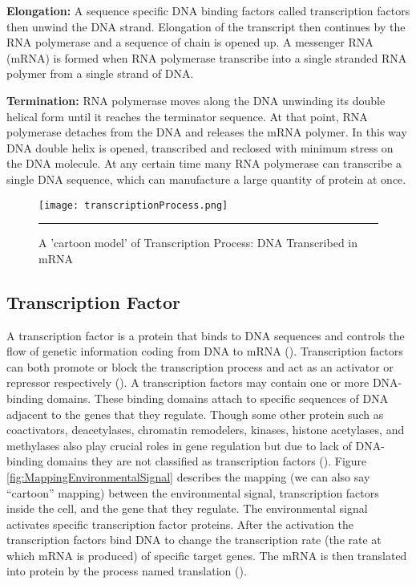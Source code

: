 \textbf{Elongation:} A sequence specific DNA binding factors called transcription factors then unwind 
the DNA strand. Elongation of the transcript then continues by the RNA polymerase and a 
sequence of chain is opened up. A messenger RNA (mRNA) is formed when RNA polymerase transcribe 
into a single stranded RNA polymer from a single strand of DNA.

\textbf{Termination:} RNA polymerase moves along the DNA unwinding its double helical form until it 
reaches the terminator sequence. At that point, RNA polymerase detaches from the DNA and 
releases the mRNA polymer. In this way DNA double helix is opened, transcribed and reclosed 
with minimum stress on the DNA molecule. At any certain time many RNA polymerase can transcribe 
a single DNA sequence, which can manufacture a large quantity of protein at once. 

\begin{figure}%
	\centering
		\texttt{[image: transcriptionProcess.png]}
		\rule{35em}{0.5pt}
	\caption{A 'cartoon model' of Transcription Process: DNA Transcribed in mRNA}
	\label{fig:transcriptionProcess}
\end{figure}

\subsection{Transcription Factor}
A transcription factor is a protein that binds to DNA sequences and controls the flow of genetic 
information coding from DNA to mRNA (\cite{karin:1990, Latchman:1997}). Transcription 
factors can both promote or block the transcription process and act as an activator 
or repressor respectively (\cite{Lee:2000, Nikolov:1997, Roeder:1996}). 
A transcription factors may contain one or more DNA-binding domains. These binding domains 
attach to specific sequences of DNA adjacent to the genes that they regulate. Though 
some other protein such as coactivators, deacetylases, chromatin remodelers, kinases, histone 
acetylases, and methylases also play crucial roles in gene regulation but due to lack 
of DNA-binding domains they are not classified as transcription factors 
(\cite{Mitchell:1989, Ptashne:1997, Brivanlou:2002}). 
Figure \ref{fig:MappingEnvironmentalSignal} describes the mapping (we can also say ``cartoon'' mapping) 
between the environmental signal, transcription factors 
inside the cell, and the gene that they regulate. The environmental signal activates 
specific transcription factor proteins. After the activation the transcription factors 
bind DNA to change the transcription rate (the rate at which mRNA is produced) of 
specific target genes. The mRNA is then translated into protein by the process named translation
(\cite{Alon:2006}). 

